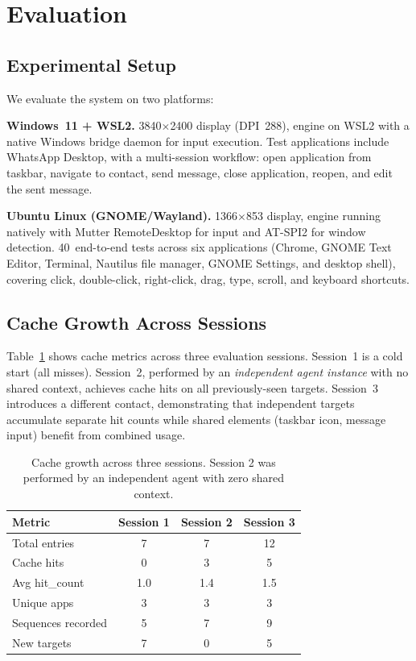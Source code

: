 \documentclass[conference]{IEEEtran}
\begin{document}
\section{Evaluation}

\subsection{Experimental Setup}

We evaluate the system on two platforms:

\textbf{Windows~11 + WSL2.} 3840$\times$2400 display (DPI~288), engine on WSL2 with a native Windows bridge daemon for input execution. Test applications include WhatsApp Desktop, with a multi-session workflow: open application from taskbar, navigate to contact, send message, close application, reopen, and edit the sent message.

\textbf{Ubuntu Linux (GNOME/Wayland).} 1366$\times$853 display, engine running natively with Mutter RemoteDesktop for input and AT-SPI2 for window detection. 40~end-to-end tests across six applications (Chrome, GNOME Text Editor, Terminal, Nautilus file manager, GNOME Settings, and desktop shell), covering click, double-click, right-click, drag, type, scroll, and keyboard shortcuts.

\subsection{Cache Growth Across Sessions}

Table~\ref{tab:cache_growth} shows cache metrics across three evaluation sessions. Session~1 is a cold start (all misses). Session~2, performed by an \emph{independent agent instance} with no shared context, achieves cache hits on all previously-seen targets. Session~3 introduces a different contact, demonstrating that independent targets accumulate separate hit counts while shared elements (taskbar icon, message input) benefit from combined usage.

\begin{table}[t]
\centering
\caption{Cache growth across three sessions. Session 2 was performed by an independent agent with zero shared context.}
\label{tab:cache_growth}
\small
\begin{tabular}{@{}lccc@{}}
\toprule
\textbf{Metric} & \textbf{Session 1} & \textbf{Session 2} & \textbf{Session 3} \\
\midrule
Total entries      & 7  & 7  & 12 \\
Cache hits         & 0  & 3  & 5  \\
Avg hit\_count     & 1.0 & 1.4 & 1.5 \\
Unique apps        & 3  & 3  & 3  \\
Sequences recorded & 5  & 7  & 9  \\
New targets        & 7  & 0  & 5  \\
\bottomrule
\end{tabular}
\end{table}
\end{document}
